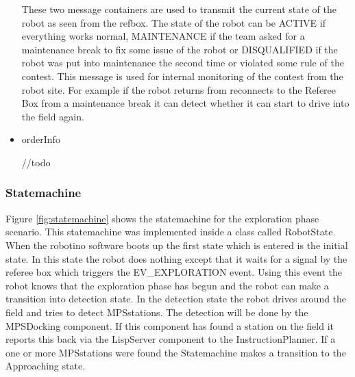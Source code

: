 \begin{itemize}
These two message containers are used to transmit the current state of the robot as seen from the refbox. The state of the robot can be ACTIVE if everything works normal, MAINTENANCE if the team asked for a maintenance break to fix some issue of the robot or DISQUALIFIED if the robot was put into maintenance the second time or violated some rule of the contest. This message is used for internal monitoring of the contest from the robot site. For example if the robot returns from reconnects to the Referee Box from a maintenance break it can detect whether it can start to drive into the field again.  


\item orderInfo

//todo 


\end{itemize}


\subsubsection{Statemachine}


Figure \ref{fig:statemachine} shows the statemachine for the exploration phase scenario. This statemachine was implemented inside a class called RobotState. When the robotino software boots up the first state which is entered is the initial state. In this state the robot does nothing except that it waits for a signal by the referee box which triggers the EV\_EXPLORATION event. Using this event the robot knows that the exploration phase has begun and the robot can make a transition into detection state. In the detection state the robot drives around the field and tries to detect MPSstations. The detection will be done by the MPSDocking component. If this component has found a station on the field it reports this back via the LispServer component to the InstructionPlanner. If a one or more MPSstations were found the Statemachine makes a transition to the Approaching state. \\

\newpage

